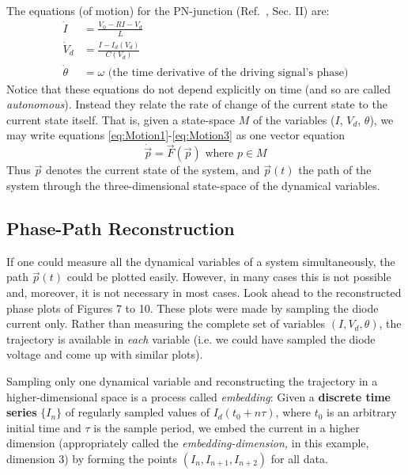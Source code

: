 \documentclass{../lab}
\begin{document}
The equations (of motion) for the PN-junction (Ref.~\cite{Cvitanovic}, Sec. II) are:
\begin{align}
    \label{eq:Motion1}
    \dot I &= \frac{V_0 - RI - V_d}{L} \\
    \label{eq:Motion2}
    \dot V_d &= \frac{I - I_d(V_d)}{C(V_d)} \\
    \label{eq:Motion3}
    \dot \theta &= \omega \text{ (the time derivative of the driving signal's phase)}
\end{align}
Notice that these equations do not depend explicitly on time (and so are called \emph{autonomous}). Instead they relate the rate of change of the current state to the current state itself. That is, given a state-space $M$ of the variables ($I$, $V_d$, $\theta$), we may write equations \eqref{eq:Motion1}-\eqref{eq:Motion3} as one vector equation
\begin{equation}
    \dot{\vec p} = \vec F (\vec p) \text{ where }p \in M
\end{equation}
Thus $\vec p$ denotes the current state of the system, and $\vec p(t)$ the path of the system through the three-dimensional state-space of the dynamical variables.

\subsection{Phase-Path Reconstruction}

If one could measure all the dynamical variables of a system simultaneously, the path $\vec p(t)$ could be plotted easily. However, in many cases this is not possible and, moreover, it is not necessary in most cases. Look ahead to the reconstructed phase plots of Figures 7 to 10. These plots were made by sampling the diode current only. Rather than measuring the complete set of variables $(I, V_d, \theta)$, the trajectory is available in \emph{each} variable (i.e. we could have sampled the diode voltage and come up with similar plots).

Sampling only one dynamical variable and reconstructing the trajectory in a higher-dimensional space is a process called \emph{embedding}: Given a \textbf{discrete time series} $\{I_n\} $ of regularly sampled values of $I_d(t_0 + n\tau)$, where $t_0$ is an arbitrary initial time and $\tau$ is the sample period, we embed the current in a higher dimension (appropriately called the \emph{embedding-dimension,} in this example, dimension 3) by forming the points $(I_n, I_{n+1}, I_{n+2})$ for all data.
\end{document}
